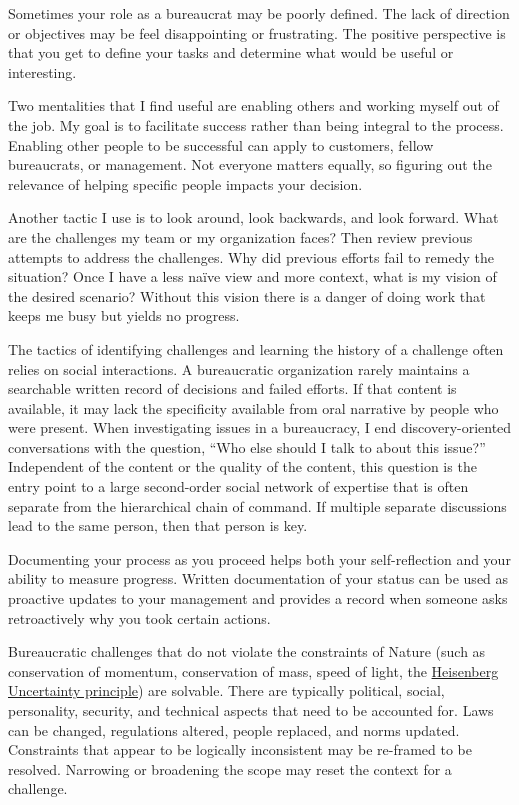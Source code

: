 Sometimes your role as a bureaucrat may be poorly defined. The lack of direction or objectives may be feel disappointing or frustrating. The positive perspective is that you get to define your tasks and determine what would be useful or interesting. 

Two mentalities that I find useful are enabling others and working myself out of the job. My goal is to facilitate success rather than being integral to the process. Enabling other people to be successful can apply to customers, fellow bureaucrats, or management. Not everyone matters equally, so figuring out the relevance of helping specific people impacts your decision. 

Another tactic I use is to look around, look backwards, and look forward. What are the challenges my team or my organization faces? Then review previous attempts to address the challenges. Why did previous efforts fail to remedy the situation? Once I have a less na\"ive view and more context, what is my vision of the desired scenario? Without this vision there is a danger of doing work that keeps me busy but yields no progress. 

The tactics of identifying challenges and learning the history of a challenge often relies on social interactions. A bureaucratic organization rarely maintains a searchable written record of decisions and failed efforts. If that content is available, it may lack the specificity available from oral narrative by people who were present. When investigating issues in a bureaucracy, I end discovery-oriented conversations with the question, ``Who else should I talk to about this issue?'' Independent of the content or the quality of the content, this question is the entry point to a large second-order social network of expertise that is often separate from the hierarchical chain of command. If multiple separate discussions lead to the same person, then that person is key. 

Documenting your process as you proceed helps both your self-reflection and your ability to measure progress. Written documentation of your status can be used as proactive updates to your management and provides a record when someone asks retroactively why you took certain actions.

Bureaucratic challenges that do not violate the constraints of Nature (such as conservation of momentum, conservation of mass, speed of light, the \href{https://en.wikipedia.org/wiki/Uncertainty_principle}{Heisenberg Uncertainty principle}) 
are solvable. There are typically political, social, personality, security, and technical aspects that need to be accounted for. Laws can be changed, regulations altered, people replaced, and norms updated. Constraints that appear to be logically inconsistent may be re-framed to be resolved. Narrowing or broadening the scope may reset the context for a challenge.



